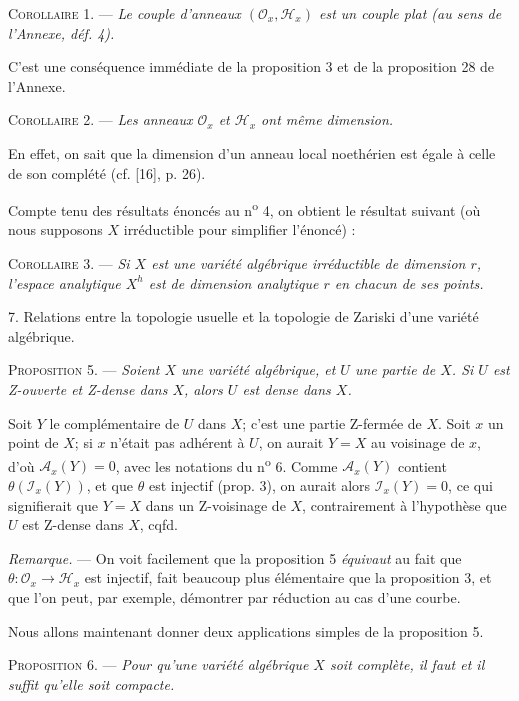 \textsc{Corollaire} 1. — \textit{Le couple d'anneaux $(\mathcal{O}_x, \mathcal{H}_x)$ est un couple plat (au sens de l'Annexe, déf. 4).}

C'est une conséquence immédiate de la proposition 3 et de la proposition 28 de l'Annexe.

\textsc{Corollaire} 2. — \textit{Les anneaux $\mathcal{O}_x$ et $\mathcal{H}_x$ ont même dimension.}

En effet, on sait que la dimension d'un anneau local noethérien est égale à celle de son complété (cf. [16], p. 26).

Compte tenu des résultats énoncés au n\textsuperscript{o} 4, on obtient le résultat suivant (où nous supposons $X$ irréductible pour simplifier l'énoncé) :

\textsc{Corollaire} 3. — \textit{Si $X$ est une variété algébrique irréductible de dimension $r$, l'espace analytique $X^h$ est de dimension analytique $r$ en chacun de ses points.}


7. Relations entre la topologie usuelle et la topologie de Zariski d'une variété algébrique.

\textsc{Proposition} 5. — \textit{Soient $X$ une variété algébrique, et $U$ une partie de $X$. Si $U$ est Z-ouverte et Z-dense dans $X$, alors $U$ est dense dans $X$.}

Soit $Y$ le complémentaire de $U$ dans $X$; c'est une partie Z-fermée de $X$. Soit $x$ un point de $X$; si $x$ n'était pas adhérent à $U$, on aurait $Y = X$ au voisinage de $x$, d'où $\mathcal{A}_x(Y) = 0$, avec les notations du n\textsuperscript{o} 6. Comme $\mathcal{A}_x(Y)$ contient $\theta(\mathcal{I}_x(Y))$, et que $\theta$ est injectif (prop. 3), on aurait alors $\mathcal{I}_x(Y) = 0$, ce qui signifierait que $Y = X$ dans un Z-voisinage de $X$, contrairement à l'hypothèse que $U$ est Z-dense dans $X$, cqfd.

\textit{Remarque.} — On voit facilement que la proposition 5 \textit{équivaut} au fait que $\theta : \mathcal{O}_x \to \mathcal{H}_x$ est injectif, fait beaucoup plus élémentaire que la proposition 3, et que l'on peut, par exemple, démontrer par réduction au cas d'une courbe.

Nous allons maintenant donner deux applications simples de la proposition 5.



\textsc{Proposition} 6. — \textit{Pour qu'une variété algébrique $X$ soit complète, il faut et il suffit qu'elle soit compacte.}

